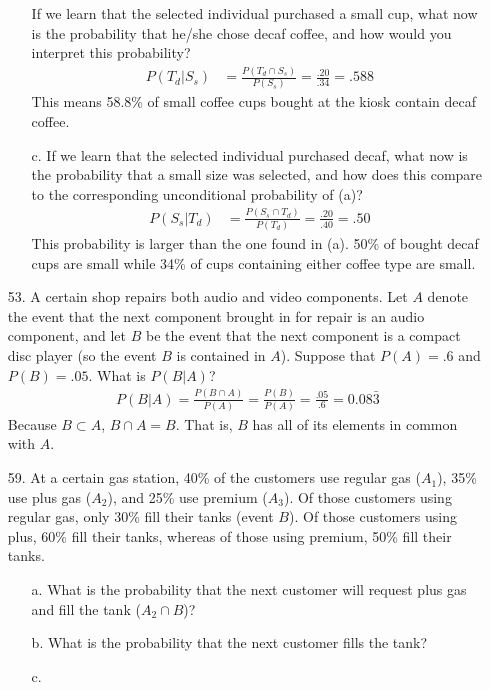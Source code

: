 \documentclass[letterpaper,12pt]{article}
\begin{document}
\begin{enumerate}
\begin{enumerate}
        If we learn that the selected individual purchased a small cup, what now is the probability that he/she chose decaf coffee, and how would you interpret this probability?
        \begin{align*}
          P(T_d|S_s) &= \frac{P(T_d \cap S_s)}{P(S_s)} = \frac{.20}{.34} = .588
        \end{align*}
        This means 58.8\% of small coffee cups bought at the kiosk contain decaf coffee.
      \item[c.]
        If we learn that the selected individual purchased decaf, what now is the probability that a small size was selected, and how does this compare to the corresponding unconditional probability of (a)?
        \begin{align*}
          P(S_s|T_d) &= \frac{P(S_s \cap T_d)}{P(T_d)} = \frac{.20}{.40} = .50
        \end{align*}
        This probability is larger than the one found in (a). 50\% of bought decaf cups are small while 34\% of cups containing either coffee type are small.
    \end{enumerate}
  \item[53.]
    A certain shop repairs both audio and video components. Let $A$ denote the event that the next component brought in for repair is an audio component, and let $B$ be the event that the next component is a compact disc player (so the event $B$ is contained in $A$). Suppose that $P(A) = .6$ and $P(B) = .05$. What is $P(B|A)$?
    \begin{align*}
      P(B|A) = \frac{P(B \cap A)}{P(A)} = \frac{P(B)}{P(A)} = \frac{.05}{.6} = 0.08\bar{3}
    \end{align*}
    Because $B \subset A$, $B \cap A = B$. That is, $B$ has all of its elements in common with $A$.
  \item[59.]
    At a certain gas station, 40\% of the customers use regular gas ($A_1$), 35\% use plus gas ($A_2$), and 25\% use premium ($A_3$). Of those customers using regular gas, only 30\% fill their tanks (event $B$). Of those customers using plus, 60\% fill their tanks, whereas of those using premium, 50\% fill their tanks.
    \begin{enumerate}
      \item[a.]
        What is the probability that the next customer will request plus gas and fill the tank ($A_2 \cap B$)?
      \item[b.]
        What is the probability that the next customer fills the tank?
      \item[c.]

\end{enumerate}
\end{enumerate}
\end{document}
